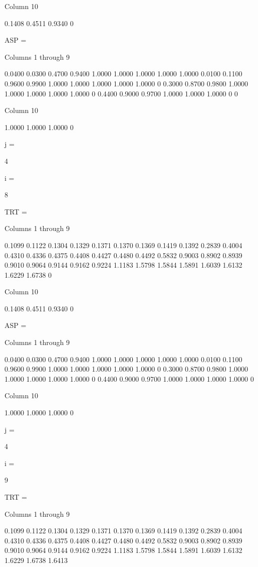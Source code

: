   Column 10

    0.1408
    0.4511
    0.9340
         0


ASP =

  Columns 1 through 9

    0.0400    0.0300    0.4700    0.9400    1.0000    1.0000    1.0000    1.0000    1.0000
    0.0100    0.1100    0.9600    0.9900    1.0000    1.0000    1.0000    1.0000    1.0000
         0    0.3000    0.8700    0.9800    1.0000    1.0000    1.0000    1.0000    1.0000
         0    0.4400    0.9000    0.9700    1.0000    1.0000    1.0000         0         0

  Column 10

    1.0000
    1.0000
    1.0000
         0


j =

     4


i =

     8


TRT =

  Columns 1 through 9

    0.1099    0.1122    0.1304    0.1329    0.1371    0.1370    0.1369    0.1419    0.1392
    0.2839    0.4004    0.4310    0.4336    0.4375    0.4408    0.4427    0.4480    0.4492
    0.5832    0.9003    0.8902    0.8939    0.9010    0.9064    0.9144    0.9162    0.9224
    1.1183    1.5798    1.5844    1.5891    1.6039    1.6132    1.6229    1.6738         0

  Column 10

    0.1408
    0.4511
    0.9340
         0


ASP =

  Columns 1 through 9

    0.0400    0.0300    0.4700    0.9400    1.0000    1.0000    1.0000    1.0000    1.0000
    0.0100    0.1100    0.9600    0.9900    1.0000    1.0000    1.0000    1.0000    1.0000
         0    0.3000    0.8700    0.9800    1.0000    1.0000    1.0000    1.0000    1.0000
         0    0.4400    0.9000    0.9700    1.0000    1.0000    1.0000    1.0000         0

  Column 10

    1.0000
    1.0000
    1.0000
         0


j =

     4


i =

     9


TRT =

  Columns 1 through 9

    0.1099    0.1122    0.1304    0.1329    0.1371    0.1370    0.1369    0.1419    0.1392
    0.2839    0.4004    0.4310    0.4336    0.4375    0.4408    0.4427    0.4480    0.4492
    0.5832    0.9003    0.8902    0.8939    0.9010    0.9064    0.9144    0.9162    0.9224
    1.1183    1.5798    1.5844    1.5891    1.6039    1.6132    1.6229    1.6738    1.6413


